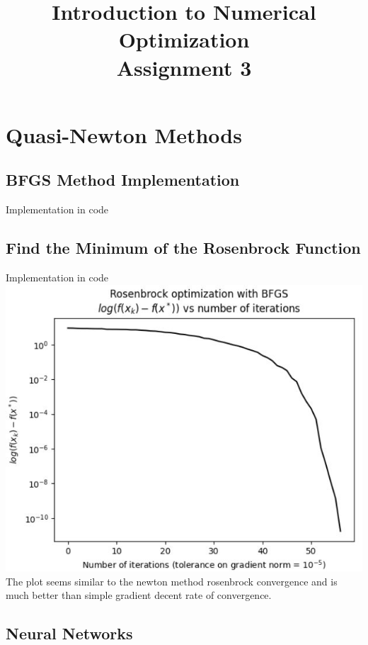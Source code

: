 \documentclass[12pt]{article}
\title{Introduction to Numerical Optimization\\Assignment 3}
\author{}
\begin{document}
\maketitle


\section{Quasi-Newton Methods}

\subsection{BFGS Method Implementation}
Implementation in code
\subsection{Find  the  Minimum  of  the  Rosenbrock  Function}
Implementation in code\\
\includegraphics{rosenbrock_BFGS_plot.JPG}\\
The plot seems similar to the newton method rosenbrock convergence and is much better than simple gradient decent rate of convergence. 
\subsection{Neural Networks}
\end{document}
